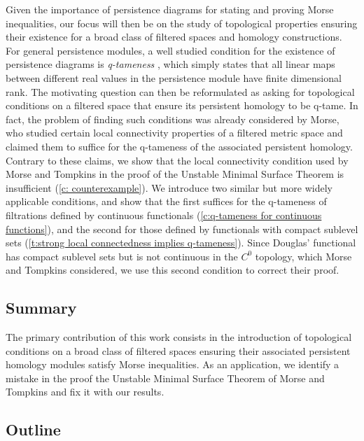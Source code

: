 Given the importance of persistence diagrams for stating and proving Morse inequalities, our focus will then be on the study of topological properties ensuring their existence for a broad class of filtered spaces and homology constructions.
For general persistence modules, a well studied condition for the existence of persistence diagrams is \emph{q-tameness} \cite{Chazal.2016a,Chazal.2016b}, which simply states that all linear maps between different real values in the persistence module have finite dimensional rank.
The motivating question can then be reformulated as asking for topological conditions on a filtered space that ensure its persistent homology to be q-tame.
In fact, the problem of finding such conditions was already considered by Morse, who studied certain local connectivity properties of a filtered metric space and claimed them to suffice for the q-tameness of the associated persistent homology.
Contrary to these claims, we show that the local connectivity condition used by Morse and Tompkins in the proof of the Unstable Minimal Surface Theorem is insufficient (\cref{c: counterexample}).
We introduce two similar but more widely applicable conditions, and show that the first suffices for the \mbox{q-tameness} of filtrations defined by continuous functionals (\cref{c:q-tameness for continuous functions}), and the second for those defined by functionals with compact sublevel sets (\cref{t:strong local connectedness implies q-tameness}).
Since Douglas' functional has compact sublevel sets but is not continuous in the $C^0$ topology, which Morse and Tompkins considered, we use this second condition to correct their proof.

\subsection*{Summary}

The primary contribution of this work consists in the introduction of topological conditions on a broad class of filtered spaces ensuring their associated persistent homology modules satisfy Morse inequalities.
As an application, we identify a mistake in the proof the Unstable Minimal Surface Theorem of Morse and Tompkins and fix it with our results. 

\subsection*{Outline}

